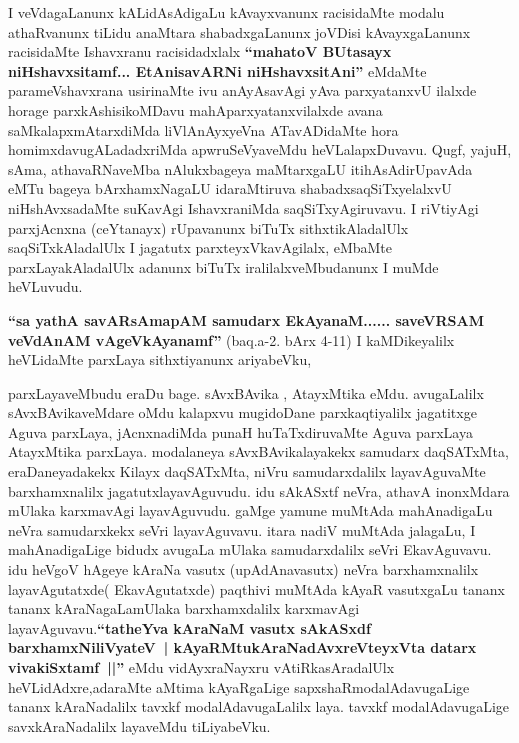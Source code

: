 \begin{artha}
I veVdagaLanunx kALidAsAdigaLu kAvayxvanunx racisidaMte modalu
athaRvanunx tiLidu anaMtara shabadxgaLanunx joVDisi kAvayxgaLanunx
racisidaMte Ishavxranu racisidadxlalx \textbf{``mahatoV BUtasayx niHshavxsitamf... EtAnisavARNi niHshavxsitAni''} eMdaMte\break
parameVshavxrana usirinaMte ivu anAyAsavAgi yAva parxyatanxvU ilalxde
horage parxkAshisikoMDavu mahAparxyatanxvilalxde avana
saMkalapxmAtarxdiMda liVlAnAyxyeVna ATavADidaMte hora
homimxdavugALadadxriMda apwruSeVyaveMdu heVLalapxDuvavu. Qugf, yajuH,
sAma, athavaRNaveMba nAlukxbageya maMtarxgaLU itihAsAdirUpavAda eMTu
bageya bArxhamxNagaLU idaraMtiruva shabadxsaqSiTxyelalxvU
niHshAvxsadaMte suKavAgi IshavxraniMda saqSiTxyAgiruvavu. I riVtiyAgi
parxjAcnxna (ceYtanayx) rUpavanunx biTuTx sithxtikAladalUlx
saqSiTxkAladalUlx I jagatutx parxteyxVkavAgilalx, eMbaMte
parxLayakAladalUlx adanunx biTuTx iralilalxveMbudanunx I muMde
heVLuvudu. 
\end{artha}

\begin{artha}
\textbf{``sa yathA savARsAmapAM samudarx EkAyanaM...... saveVRSAM veVdAnAM vAgeVkAyanamf''} (baq.a-2. bArx 4-11) I kaMDikeyalilx heVLidaMte parxLaya
 sithxtiyanunx ariyabeVku,
\end{artha}
\newpage
\centerline{ }

\begin{artha}
parxLayaveMbudu eraDu bage. sAvxBAvika , AtayxMtika eMdu. avugaLalilx
 sAvxBAvikaveMdare oMdu kalapxvu mugidoDane parxkaqtiyalilx jagatitxge
Aguva parxLaya, jAcnxnadiMda punaH huTaTxdiruvaMte Aguva parxLaya
AtayxMtika parxLaya. modalaneya sAvxBAvikalayakekx samudarx
daqSATxMta, eraDaneyadakekx Kilayx daqSATxMta, niVru  samudarxdalilx
layavAguvaMte barxhamxnalilx jagatutxlayavAguvudu. idu sAkASxtf neVra, athavA
inonxMdara mUlaka karxmavAgi layavAguvudu. gaMge yamune muMtAda
mahAnadigaLu neVra samudarxkekx seVri layavAguvavu. itara nadiV
muMtAda jalagaLu, I mahAnadigaLige bidudx avugaLa mUlaka
samudarxdalilx seVri EkavAguvavu. idu heVgoV hAgeye kAraNa vasutx
(upAdAnavasutx) neVra barxhamxnalilx layavAgutatxde( EkavAgutatxde)
paqthivi muMtAda kAyaR vasutxgaLu tananx tananx kAraNagaLamUlaka
barxhamxdalilx karxmavAgi layavAguvavu.\textbf{``tatheYva kAraNaM vasutx sAkASxdf barxhamxNiliVyateV~| kAyaRMtukAraNadAvxreVteyxVta datarx vivakiSxtamf~||''} eMdu vidAyxraNayxru
vAtiRkasAradalUlx heVLidAdxre,adaraMte aMtima kAyaRgaLige
sapxshaRmodalAdavugaLige tananx kAraNadalilx tavxkf
modalAdavugaLalilx laya. tavxkf modalAdavugaLige savxkAraNadalilx
layaveMdu tiLiyabeVku.
\end{artha}

